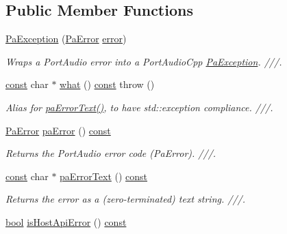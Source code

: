 \subsection*{Public Member Functions}
\begin{DoxyCompactItemize}
\item 
\hyperlink{classportaudio_1_1_pa_exception_a6b7027b327f4dc62f6bd6665f9478e53}{Pa\+Exception} (\hyperlink{portaudio_8h_a4949e4a8ef9f9dbe8cbee414ce69841d}{Pa\+Error} \hyperlink{sndfile__save_8m_ada4b423bc19e6ff5c5b514e55f518a82}{error})
\begin{DoxyCompactList}\small\item\em Wraps a Port\+Audio error into a Port\+Audio\+Cpp \hyperlink{classportaudio_1_1_pa_exception}{Pa\+Exception}. ///. \end{DoxyCompactList}\item 
\hyperlink{getopt1_8c_a2c212835823e3c54a8ab6d95c652660e}{const} char $\ast$ \hyperlink{classportaudio_1_1_pa_exception_af1d551c0c9de378b00efcdbe2c752857}{what} () \hyperlink{getopt1_8c_a2c212835823e3c54a8ab6d95c652660e}{const}   throw ()
\begin{DoxyCompactList}\small\item\em Alias for \hyperlink{classportaudio_1_1_pa_exception_ad139949eecc8955b1869b0e938191331}{pa\+Error\+Text()}, to have std\+::exception compliance. ///. \end{DoxyCompactList}\item 
\hyperlink{portaudio_8h_a4949e4a8ef9f9dbe8cbee414ce69841d}{Pa\+Error} \hyperlink{classportaudio_1_1_pa_exception_af7f8a6b5448288c51228cd9cf7b8ea06}{pa\+Error} () \hyperlink{getopt1_8c_a2c212835823e3c54a8ab6d95c652660e}{const} 
\begin{DoxyCompactList}\small\item\em Returns the Port\+Audio error code (Pa\+Error). ///. \end{DoxyCompactList}\item 
\hyperlink{getopt1_8c_a2c212835823e3c54a8ab6d95c652660e}{const} char $\ast$ \hyperlink{classportaudio_1_1_pa_exception_ad139949eecc8955b1869b0e938191331}{pa\+Error\+Text} () \hyperlink{getopt1_8c_a2c212835823e3c54a8ab6d95c652660e}{const} 
\begin{DoxyCompactList}\small\item\em Returns the error as a (zero-\/terminated) text string. ///. \end{DoxyCompactList}\item 
\hyperlink{mac_2config_2i386_2lib-src_2libsoxr_2soxr-config_8h_abb452686968e48b67397da5f97445f5b}{bool} \hyperlink{classportaudio_1_1_pa_exception_a21d789f84e9a1b6a9b6fe311a6f619e4}{is\+Host\+Api\+Error} () \hyperlink{getopt1_8c_a2c212835823e3c54a8ab6d95c652660e}{const} 

\end{DoxyCompactItemize}
